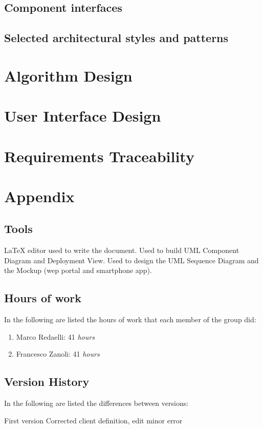\documentclass{../Common/Structure/doc_pdf}
\begin{document}
\section{Component interfaces}

\section{Selected architectural styles and patterns}


\chapter{Algorithm Design}

\chapter{User Interface Design}

\chapter{Requirements Traceability}


\appendix
\chapter{Appendix}

\section{Tools}
\begin{itemize}
	 \LaTeX{} editor used to write the document.
	 Used to build UML Component Diagram and Deployment View.
	 Used to design the UML Sequence Diagram and the Mockup (wep portal and smartphone app).
\end{itemize}
\newpage
\section{Hours of work}
In the following are listed the hours of work that each member of the group did:
\begin{enumerate}
	\item Marco Redaelli: 41 \emph{hours}
	\item Francesco Zanoli: 41 \emph{hours}
\end{enumerate}
\newpage
\section{Version History}
In the following are listed the differences between versions:
\begin{enumerate}
	 First version
	 Corrected client definition, edit minor error
\end{enumerate}
\end{document}
